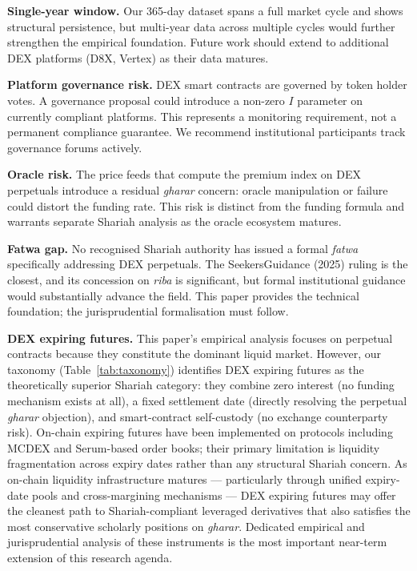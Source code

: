 \documentclass[10pt,twocolumn]{article}
\begin{document}
\textbf{Single-year window.} Our 365-day dataset spans a full market cycle and
shows structural persistence, but multi-year data across multiple cycles would
further strengthen the empirical foundation. Future work should extend to
additional DEX platforms (D8X, Vertex) as their data matures.

\textbf{Platform governance risk.} DEX smart contracts are governed by token
holder votes. A governance proposal could introduce a non-zero $I$ parameter on
currently compliant platforms. This represents a monitoring requirement, not a
permanent compliance guarantee. We recommend institutional participants track
governance forums actively.

\textbf{Oracle risk.} The price feeds that compute the premium index on DEX
perpetuals introduce a residual \textit{gharar} concern: oracle manipulation
or failure could distort the funding rate. This risk is distinct from the
funding formula and warrants separate Shariah analysis as the oracle ecosystem
matures.

\textbf{Fatwa gap.} No recognised Shariah authority has issued a formal
\textit{fatwa} specifically addressing DEX perpetuals. The SeekersGuidance
(2025) ruling is the closest, and its concession on \textit{riba} is
significant, but formal institutional guidance would substantially advance
the field. This paper provides the technical foundation; the jurisprudential
formalisation must follow.

\textbf{DEX expiring futures.}
This paper's empirical analysis focuses on perpetual contracts because they
constitute the dominant liquid market. However, our taxonomy (Table~\ref{tab:taxonomy})
identifies DEX expiring futures as the theoretically superior Shariah category:
they combine zero interest (no funding mechanism exists at all), a fixed
settlement date (directly resolving the perpetual \textit{gharar} objection),
and smart-contract self-custody (no exchange counterparty risk). On-chain
expiring futures have been implemented on protocols including MCDEX and
Serum-based order books; their primary limitation is liquidity fragmentation
across expiry dates rather than any structural Shariah concern.
As on-chain liquidity infrastructure matures --- particularly through unified
expiry-date pools and cross-margining mechanisms --- DEX expiring futures may
offer the cleanest path to Shariah-compliant leveraged derivatives that also
satisfies the most conservative scholarly positions on \textit{gharar}.
Dedicated empirical and jurisprudential analysis of these instruments is
the most important near-term extension of this research agenda.
\end{document}
